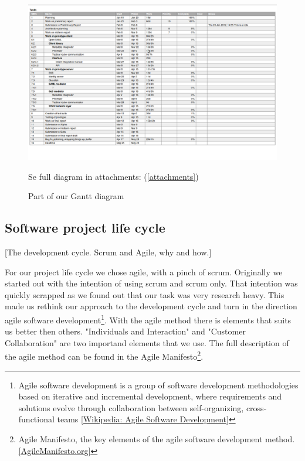 \documentclass[12pt]{article}
\begin{document}
        \begin{figure}[h]
            \centering
            \includegraphics[scale=0.3]{gantt}
            \caption{Part of our Gantt diagram} Se full diagram in attachments: (\ref{attachments})
            \label{fig:gantt}
        \end{figure}
    
    \subsection{Software project life cycle} [The development cycle. Scrum and Agile, why and how.]
    
    For our project life cycle we chose agile, with a pinch of scrum. Originally we started out with the intention of using scrum and scrum only. That intention was quickly scrapped as we found out that our task was very research heavy. This made us rethink our approach to the development cycle and turn in the direction agile software development\footnote
        {Agile software development is a group of software development methodologies based on iterative and incremental development, where requirements and solutions evolve through collaboration between self-organizing, cross-functional teams \href{http://en.wikipedia.org/wiki/Agile_software_development.}{[Wikipedia: Agile Software Development]}}. 
    With the agile method there is elements that suits us better then others. "Individuals and Interaction" and "Customer Collaboration" are two importand elements that we use. The full description of the agile method can be found in the Agile Manifesto\footnote
        {Agile Manifesto, the key elements of the agile software development method. \href{http://http://agilemanifesto.org/}{[AgileManifesto.org]}}.
    
\end{document}
